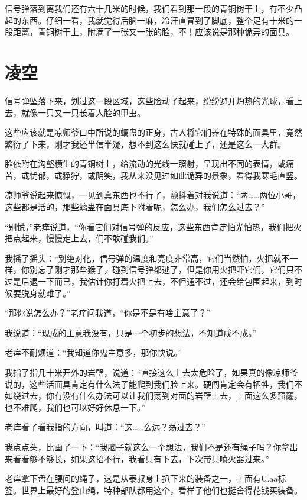 信号弹落到离我们还有六十几米的时候，我们看到那一段的青铜树干上，有不少凸起的东西。仔细一看，我就觉得后脑一麻，冷汗直冒到了脚底，整个足有十米的一段距离，青铜树干上，附满了一张又一张的脸，不！应该说是那种诡异的面具。

\chapter{凌空}

信号弹坠落下来，划过这一段区域，这些脸动了起来，纷纷避开灼热的光球，看上去，就像一只又一只长着人脸的甲虫。

这些应该就是凉师爷口中所说的螭蛊的正身，古人将它们养在特殊的面具里，竟然繁衍了下来，刚才我还半信半疑，想不到这么快就碰上了，还是这么一大群。

脸依附在沟壑横生的青铜树上，给流动的光线一照射，呈现出不同的表情，或痛苦，或忧郁，或狰狞，或阴笑，我从来没见过如此诡异的景象，看得我寒毛直竖。

凉师爷说起来慷慨，一见到真东西也不行了，颤抖着对我说道：“两……两位小哥，这些都是活的，那些螭蛊在面具底下附着呢，怎么办，我们怎么过去？”

“别慌，”老痒说道，“你看它们对信号弹的反应，这些东西肯定怕光怕热，我们把火把点起来，慢慢走上去，们不敢碰我们。”

我摇了摇头：“别绝对化，信号弹的温度和亮度非常高，它们当然怕，火把就不一样，你别忘了刚才那些猴子，碰到信号弹都逃了，但是你用火把吓它们，它们只不过是后退一下而已，我估计你打着火把上去，不但通不过，还会给包围起来，到时候要脱身就难了。”

“那你说怎么办？”老痒问我道，“你是不是有啥主意了？”

我说道：“现成的主意我没有，只是一个初步的想法，不知道成不成。”

老痒不耐烦道：“我知道你鬼主意多，那你快说。”

我指了指几十米开外的岩壁，说道：“直接这么上去太危险了，如果真的像凉师爷说的，这些活面具肯定有什么法子能爬到我们脸上来。硬闯肯定会有牺牲，我们不如绕过去，你有没有什么办法可以让我们荡到对面的岩壁上去，上面这么多窟窿，也不难爬，我们也可以好好休息一下。”

老痒看了看我指的方向，叫道：“这……么远？荡过去？”

我点点头，比画了一下：“我脑子就这么一个想法，我们不是还有绳子吗？你拿出来看看够不够长，如果这招不行，我看只有下去，下次带只喷火器过来。”

老痒拿下盘在腰间的绳子，这是从泰叔身上扒下来的装备之一，上面有U.aa标签。世界上最好的登山绳，特种部队都用这个，看样子他们也挺舍得花钱买装备。

